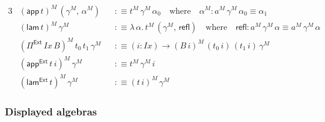 \documentclass[12pt,a4paper,twoside,openany]{book}
\theoremstyle{remark}
\theoremstyle{definition}
\theoremstyle{theorem}
\newcommand{\mi}[1]{\mathit{#1}}
\newcommand{\ms}[1]{\mathsf{#1}}
\newcommand{\refl}{\mathsf{refl}}
\newcommand{\Pie}{\Pi^{\mathsf{Ext}}}
\newcommand{\appe}{\mathsf{app^{Ext}}}
\newcommand{\lame}{\mathsf{lam^{Ext}}}
\newcommand{\app}{\ms{app}}
\newcommand{\lam}{\ms{lam}}
\newcommand{\defn}{:\equiv}
\begin{document}
\begin{alignat*}{3}
  &(\app\,t)^M\,(\gamma^M,\,\alpha^M) &&\defn t^M\,\gamma^M\,\alpha_0\hspace{1em}\text{where}\hspace{1em} \alpha^M : a^M\,\gamma^M\,\alpha_0 \equiv \alpha_1\\
  &(\lam\,t)^M\,\gamma^M &&\defn \lambda\,\alpha.\,t^M\,(\gamma^M,\,\refl)\hspace{1em}\text{where}\hspace{1em} \refl : a^M\,\gamma^M\,\alpha \equiv a^M\,\gamma^M\,\alpha\\
  &(\Pie\,\mi{Ix}\,B)^M\,t_0\,t_1\,\gamma^M &&\defn (i : \mi{Ix}) \to (B\,i)^M\,(t_0\,i)\,(t_1\,i)\,\gamma^M\\
  &(\appe\,t\,i)^M\,\gamma^M &&\defn t^M\,\gamma^M\,i\\
  &(\lame\,t)^M\,\gamma^M &&\defn (t\,i)^M\,\gamma^M
\end{alignat*}

\subsubsection{Displayed algebras}
\end{document}
